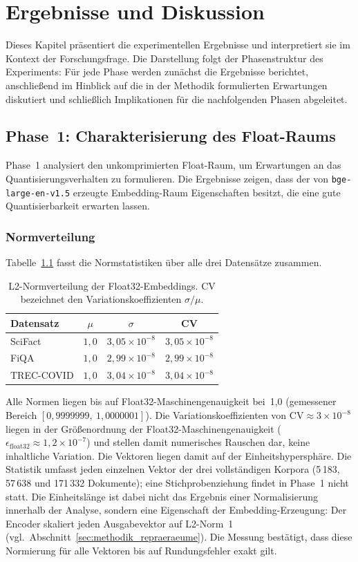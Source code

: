 \chapter{Ergebnisse und Diskussion}
\label{chap:ergebnisse}
%
Dieses Kapitel präsentiert die experimentellen Ergebnisse und interpretiert sie im Kontext der Forschungsfrage.
Die Darstellung folgt der Phasenstruktur des Experiments: Für jede Phase werden zunächst die Ergebnisse berichtet, anschließend im Hinblick auf die in der Methodik formulierten Erwartungen diskutiert und schließlich Implikationen für die nachfolgenden Phasen abgeleitet.
%
\section{Phase~1: Charakterisierung des Float-Raums}
\label{sec:ergebnisse_phase1}
%
Phase~1 analysiert den unkomprimierten Float-Raum, um Erwartungen an das Quantisierungsverhalten zu formulieren.
Die Ergebnisse zeigen, dass der von \texttt{bge-\allowbreak large-\allowbreak en-\allowbreak v1.5} erzeugte Embedding-Raum Eigenschaften besitzt, die eine gute Quantisierbarkeit erwarten lassen.
%
\subsection{Normverteilung}
%
Tabelle~\ref{tab:phase1_norms} fasst die Normstatistiken über alle drei Datensätze zusammen.
%
\begin{table}[htbp]
  \centering
  \caption[L2-Normverteilung der Float32-Embeddings]{L2-Normverteilung der Float32-Embeddings. CV bezeichnet den Variationskoeffizienten $\sigma / \mu$.}
  \label{tab:phase1_norms}
  \begin{tabular}{lccc}
    \toprule
    Datensatz & $\mu$ & $\sigma$ & CV \\
    \midrule
    SciFact     & $1{,}0$ & $3{,}05 \times 10^{-8}$ & $3{,}05 \times 10^{-8}$ \\
    FiQA        & $1{,}0$ & $2{,}99 \times 10^{-8}$ & $2{,}99 \times 10^{-8}$ \\
    TREC-COVID  & $1{,}0$ & $3{,}04 \times 10^{-8}$ & $3{,}04 \times 10^{-8}$ \\
    \bottomrule
  \end{tabular}
\end{table}
%
Alle Normen liegen bis auf Float32-Maschinengenauigkeit bei~1{,}0 (gemessener Bereich $[0{,}9999999,\ 1{,}0000001]$).
Die Variationskoeffizienten von $\text{CV} \approx 3 \times 10^{-8}$ liegen in der Größenordnung der Float32-Maschinengenauigkeit ($\epsilon_{\text{float32}} \approx 1{,}2 \times 10^{-7}$) und stellen damit numerisches Rauschen dar, keine inhaltliche Variation.
Die Vektoren liegen damit auf der Einheitshypersphäre.
Die Statistik umfasst jeden einzelnen Vektor der drei vollständigen Korpora (5\,183, 57\,638 und 171\,332 Dokumente); eine Stichprobenziehung findet in Phase~1 nicht statt.
Die Einheitslänge ist dabei nicht das Ergebnis einer Normalisierung innerhalb der Analyse, sondern eine Eigenschaft der Embedding-Erzeugung: Der Encoder skaliert jeden Ausgabevektor auf L2-Norm~1 (vgl.\ Abschnitt~\ref{sec:methodik_repraeraeume}).
Die Messung bestätigt, dass diese Normierung für alle Vektoren bis auf Rundungsfehler exakt gilt.
%
